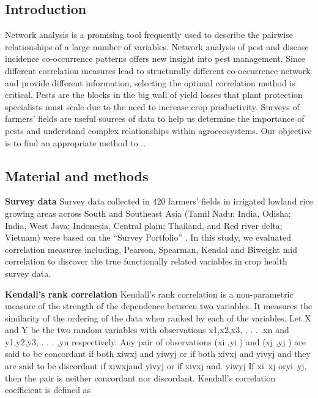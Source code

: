 
\subsection*{Introduction}

Network analysis is a promising tool frequently used to describe the pairwise relationships of a large number of variables. Network analysis of pest and disease incidence co-occurrence patterns offers new insight into pest management. Since different correlation measures lead to structurally different co-occurrence network and provide different information, selecting the optimal correlation method is critical. Pests are the blocks in the big wall of yield losses that plant protection specialists must scale due to the need to increase crop productivity. Surveys of farmers’ fields are useful sources of data to help us determine the importance of pests and understand complex relationships within agroecosystems. Our objective is to find an appropriate method to ..

% 

\subsection*{Material and methods}
\textbf{Survey data}
Survey data collected in 420 farmers’ fields in irrigated lowland rice growing areas across South and Southeast Asia (Tamil Nadu; India, Odisha; India, West Java; Indonesia, Central plain; Thailand, and Red river delta; Vietnam) were based on the “Survey Portfolio” . In this study, we evaluated correlation measures including, Pearson, Spearman, Kendal and Biweight mid correlation to discover the true functionally related variables in crop health survey data.


\textbf{Kendall’s rank correlation}
Kendall’s rank correlation is a non-parametric measure of the strength of the dependence between two variables. It measures the similarity of the ordering of the data when ranked by each of the variables.
Let X and Y be the two random variables with observations x1,x2,x3, . . . ,xn and y1,y2,y3, . . . ,yn respectively. Any pair of observations (xi ,yi ) and (xj ,yj ) are said to be concordant if both xiwxj and yiwyj or if both xivxj and yivyj and they are said to be discordant if xiwxjand yivyj or if xivxj and. yiwyj If xi~xj oryi~yj, then the pair is neither concordant nor discordant.
Kendall’s correlation coefficient is defined as 


